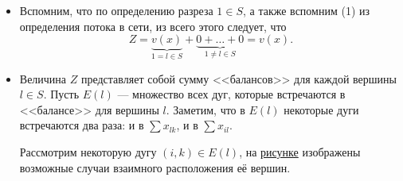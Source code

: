 \begin{itemize}[nosep]
	\item[\fbox{1}] Вспомним, что по определению разреза $1 \in S$, а также вспомним (1) из определения потока в сети, из всего этого следует, что
	\[
	Z = \underbrace{v(x)}_{1 = l \in S} + \underbrace{0 + \dots + 0}_{1 \neq l \in S} = v(x).
	\]
	
	\item[\fbox{2}] Величина $Z$ представляет собой сумму <<балансов>> для каждой вершины $l \in S$. Пусть $E(l)$ --- множество всех дуг, которые встречаются в <<балансе>> для вершины $l$. Заметим, что в $E(l)$ некоторые дуги встречаются два раза: и в $\sum x_{lk}$, и в $\sum {x_{il}}$.
	
	Рассмотрим некоторую дугу $(i, k) \in E(l)$, на \hyperref[fig:ik_placement]{рисунке} изображены возможные случаи взаимного расположения её вершин.
	

\end{itemize}

